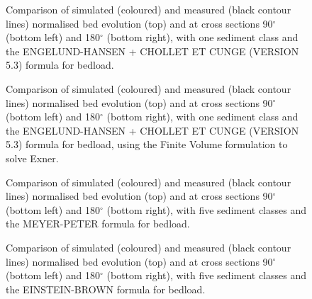 \begin{figure} [!h]
\centering
{}
\caption{Comparison of simulated (coloured) and measured (black contour lines) normalised bed evolution (top) and  at cross sections 90$^{\circ}$ (bottom left) and 180$^{\circ}$ (bottom right), with one sediment class and the ENGELUND-HANSEN + CHOLLET ET CUNGE (VERSION 5.3) formula for bedload.}\label{fig:results}
\end{figure}
\begin{figure} [!h]
\centering
{}
\caption{Comparison of simulated (coloured) and measured (black contour lines) normalised bed evolution (top) and  at cross sections 90$^{\circ}$ (bottom left) and 180$^{\circ}$ (bottom right),
with one sediment class and the ENGELUND-HANSEN + CHOLLET ET CUNGE (VERSION 5.3)
  formula for bedload, using the Finite Volume formulation to solve Exner.}\label{fig:results_vf}
\end{figure}
\begin{figure} [!h]
\centering
{}
\caption{Comparison of simulated (coloured) and measured (black contour lines) normalised bed evolution (top) and  at cross sections 90$^{\circ}$ (bottom left) and 180$^{\circ}$ (bottom right),
with five sediment classes and the MEYER-PETER formula for bedload.}\label{fig:results_multi1}
\end{figure}
\begin{figure} [!h]
\centering
{}
\caption{Comparison of simulated (coloured) and measured (black contour lines) normalised bed evolution (top) and  at cross sections 90$^{\circ}$ (bottom left) and 180$^{\circ}$ (bottom right),
with five sediment classes and the EINSTEIN-BROWN formula for bedload.}\label{fig:results_multi2}
\end{figure}
